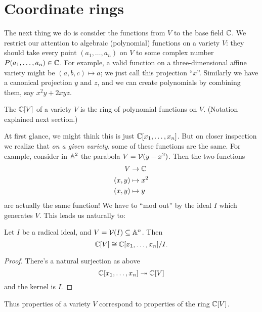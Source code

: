

\section{Coordinate rings}

The next thing we do is consider the functions from $V$ to the base field $\mathbb C$.
We restrict our attention to algebraic (polynomial) functions on a variety $V$:
they should take every point $(a_1, \dots, a_n)$ on $V$ to some complex number $P(a_1, \dots, a_n) \in \mathbb C$.
For example, a valid function on a three-dimensional affine variety might be $(a,b,c) \mapsto a$;
we just call this projection ``$x$''.
Similarly we have a canonical projection $y$ and $z$,
and we can create polynomials by combining them,
say $x^2y + 2xyz$.

\begin{definition}
	The  $\mathbb C[V]$ of a variety $V$
	is the ring of polynomial functions on $V$.
	(Notation explained next section.)
\end{definition}

At first glance, we might think this is just $\mathbb C[x_1, \dots, x_n]$.
But on closer inspection we realize that \emph{on a given variety},
some of these functions are the same.
For example, consider in $\mathbb A^2$ the parabola $V = \mathcal V(y-x^2)$.
Then the two functions
\begin{align*}
	V & \to \mathbb C \\
	(x,y) & \mapsto x^2 \\
	(x,y) & \mapsto y
\end{align*}
are actually the same function!
We have to ``mod out'' by the ideal $I$ which generates $V$.
This leads us naturally to:
\begin{theorem}
	Let $I$ be a radical ideal, and $V = \mathcal V(I) \subseteq \mathbb A^n$.
	Then \[ \mathbb C[V] \cong \mathbb C[x_1, \dots, x_n] / I.  \]
\end{theorem}
\begin{proof}
	There's a natural surjection as above
	\[ \mathbb C[x_1, \dots, x_n] \twoheadrightarrow \mathbb C[V] \]
	and the kernel is $I$.
\end{proof}
Thus properties of a variety $V$ correspond to properties of the ring $\mathbb C[V]$.

